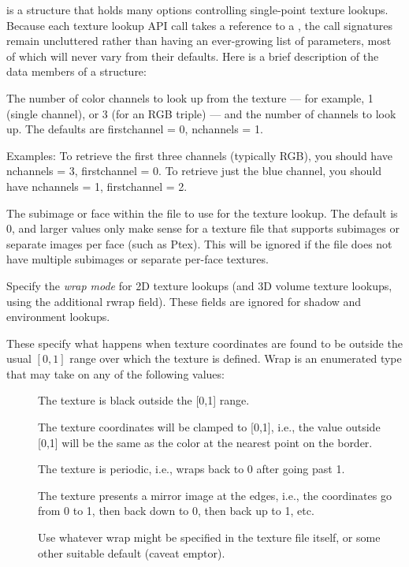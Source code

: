 \TextureOpt is a structure that holds many options controlling
single-point texture lookups.  Because each texture lookup API call takes
a reference to a \TextureOpt, the call signatures remain uncluttered
rather than having an ever-growing list of parameters, most of which
will never vary from their defaults.  Here is a brief description of
the data members of a \TextureOpt structure:

The number of color channels to look up from the texture --- for
example, 1 (single channel), or 3 (for an RGB triple) --- and the number
of channels to look up.  The defaults are firstchannel = 0, nchannels =
1.

Examples: To retrieve the first three channels (typically RGB), you
should have nchannels = 3, firstchannel = 0.  To retrieve just the blue
channel, you should have nchannels = 1, firstchannel = 2.
\apiend

The subimage or face within the file to use for the texture lookup.
The default is 0, and larger values only make sense for a texture file
that supports subimages or separate images per face (such as Ptex).
This will be ignored if the file does not have multiple subimages or
separate per-face textures.
\apiend

Specify the \emph{wrap mode} for 2D texture lookups (and 3D volume
texture lookups, using the additional {\cf rwrap} field).  These fields
are ignored for shadow and environment lookups.

These specify what happens when texture coordinates are found to be
outside the usual $[0,1]$ range over which the texture is defined.
{\cf Wrap} is an enumerated type that may take on any of the
following values:
\begin{description}
\item[\spc] \spc
\item[\rm {}] The texture is black outside the [0,1] range.
\item[\rm {}] The texture coordinates will be clamped to
  [0,1], i.e., the value outside [0,1] will be the same as the color
  at the nearest point on the border.
\item[\rm {}] The texture is periodic, i.e., wraps back
  to 0 after going past 1.
\item[\rm {}] The texture presents a mirror image at the
  edges, i.e., the coordinates go from 0 to 1, then back down to 0, then
  back up to 1, etc.
\item[\rm {}] Use whatever wrap might be specified in the
  texture file itself, or some other suitable default (caveat emptor).
\end{description}

